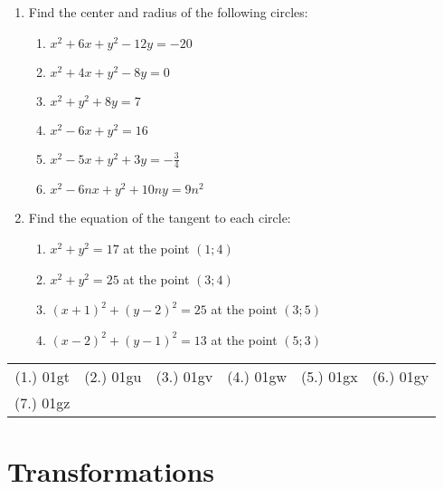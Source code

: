 {\begin{enumerate}
\item Find the center and radius of the following circles: 
\begin{enumerate} 
\item $ x^2 + 6x + y^2 - 12y = -20 $ 
\item $ x^2 + 4x + y^2 - 8y = 0 $ 
\item $ x^2 + y^2 + 8y = 7 $ 
\item $ x^2 - 6x + y^2 = 16 $ 
\item $ x^2 - 5x + y^2 + 3y = -\frac{3}{4} $ 
\item $ x^2 - 6nx + y^2 + 10ny = 9n^2 $ 
\end{enumerate} 

\item Find the equation of the tangent to each circle: 
\begin{enumerate} 
\item $ x^2 + y^2 = 17 $ at the point $(1;4)$ 
\item $ x^2 + y^2 = 25 $ at the point $(3;4)$ 
\item $ (x+1)^2 + (y-2)^2 = 25 $ at the point $(3;5)$ 
\item $ (x-2)^2 + (y-1)^2 = 13 $ at the point $(5;3)$ 
\end{enumerate} 
\end{enumerate}

\par \practiceinfo
\par \begin{tabular}[h]{cccccc}
(1.)	01gt	&
(2.)	01gu	&
(3.)	01gv	&
(4.)	01gw	&
(5.)	01gx	&
(6.)	01gy	\\ %
(7.)	01gz	&
\end{tabular}}

\section{Transformations}

